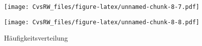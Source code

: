 \documentclass[
]{article}
\newenvironment{Shaded}{\begin{snugshade}}{\end{snugshade}}
\newcommand{\DataTypeTok}[1]{\textcolor[rgb]{0.13,0.29,0.53}{#1}}
\newcommand{\DecValTok}[1]{\textcolor[rgb]{0.00,0.00,0.81}{#1}}
\newcommand{\FloatTok}[1]{\textcolor[rgb]{0.00,0.00,0.81}{#1}}
\newcommand{\KeywordTok}[1]{\textcolor[rgb]{0.13,0.29,0.53}{\textbf{#1}}}
\newcommand{\NormalTok}[1]{#1}
\newcommand{\OperatorTok}[1]{\textcolor[rgb]{0.81,0.36,0.00}{\textbf{#1}}}
\newcommand{\StringTok}[1]{\textcolor[rgb]{0.31,0.60,0.02}{#1}}
\begin{document}
\texttt{[image: CvsRW\_files/figure-latex/unnamed-chunk-8-7.pdf]}

\begin{Shaded}
\end{Shaded}

\texttt{[image: CvsRW\_files/figure-latex/unnamed-chunk-8-8.pdf]}

Häufigkeitsverteilung

\begin{Shaded}
\end{Shaded}
\end{document}
